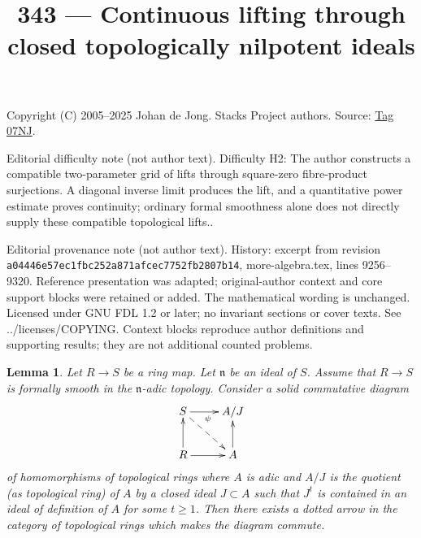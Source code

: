 \documentclass{amsart}
\theoremstyle{plain}
\newtheorem{lemma}[subsection]{Lemma}
\theoremstyle{definition}
\theoremstyle{remark}
\numberwithin{equation}{subsection}
\begin{document}
\title[Stacks Project, Tag 07NJ]{343 --- Continuous lifting through closed topologically nilpotent ideals}
\maketitle
\noindent Copyright (C) 2005--2025 Johan de Jong. Stacks Project authors. Source: \href{https://stacks.math.columbia.edu/tag/07NJ}{Tag 07NJ}.

\noindent Editorial difficulty note (not author text). Difficulty H2: The author constructs a compatible two-parameter grid of lifts through square-zero fibre-product surjections. A diagonal inverse limit produces the lift, and a quantitative power estimate proves continuity; ordinary formal smoothness alone does not directly supply these compatible topological lifts..

\noindent Editorial provenance note (not author text). History: excerpt from revision \texttt{a0444\allowbreak 6e57e\allowbreak c1fbc\allowbreak 252a8\allowbreak 71afc\allowbreak ec775\allowbreak 2fb28\allowbreak 07b14}, more-algebra.tex, lines 9256--9320. Reference presentation was adapted; original-author context and core support blocks were retained or added. The mathematical wording is unchanged. Licensed under GNU FDL 1.2 or later; no invariant sections or cover texts. See ../licenses/COPYING. Context blocks reproduce author definitions and supporting results; they are not additional counted problems.

\begin{lemma}
\label{lemma-lift-continuous}
Let $R \to S$ be a ring map. Let $\mathfrak n$ be an ideal of $S$.
Assume that $R \to S$ is formally smooth in the $\mathfrak n$-adic
topology. Consider a solid commutative diagram
$$
\xymatrix{
S \ar[r]_\psi \ar@{-->}[rd] & A/J \\
R \ar[r] \ar[u] & A \ar[u]
}
$$
of homomorphisms of topological rings where $A$ is adic
and $A/J$ is the quotient (as topological ring) of $A$ by a closed ideal
$J \subset A$ such that $J^t$ is contained in an ideal of definition
of $A$ for some $t \geq 1$. Then there exists a dotted arrow in the category of
topological rings which makes the diagram commute.
\end{lemma}
\end{document}
